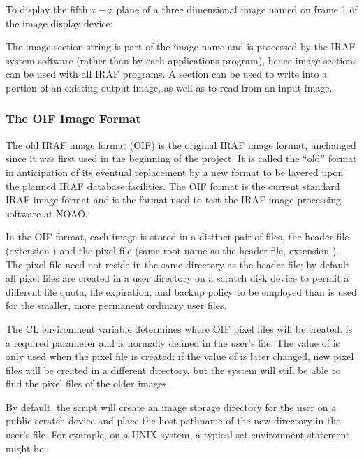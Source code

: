 \noindent
To display the fifth $x-z$ plane of a three dimensional image named 
 on frame 1 of the image display device:

\begin{quotation}\noindent
{} 
\end{quotation}

\noindent
The image section string is part of the image name and is processed by
the IRAF system software (rather than by each applications program),
hence image sections can be used with all IRAF programs.  A section can
be used to write into a portion of an existing output image, as well as to
read from an input image.

\subsubsection{The OIF Image Format}

\ppind
The old IRAF image format (OIF) is the original IRAF image format,
unchanged since it was first used in the beginning of the project. 
It is called the ``old'' format in anticipation of its eventual replacement
by a new format to be layered upon the planned IRAF database facilities.
The OIF format is the current standard IRAF image format and is the format
used to test the IRAF image processing software at NOAO.

In the OIF format, each image is stored in a distinct pair of files, the
header file (extension ) and the pixel file (same root name as
the header file, extension ).  The pixel file need not reside in
the same directory as the header file; by default all pixel files are
created in a user directory on a scratch disk device to permit a different
file quota, file expiration, and backup policy to be employed than is used
for the smaller, more permanent ordinary user files.

The CL environment variable  determines where OIF pixel files
will be created.   is a required parameter and is normally
defined in the user's  file.  The value of 
is only used when the pixel file is created; if the value of 
is later changed, new pixel files will be created in a different directory,
but the system will still be able to find the pixel files of the older images.

By default, the  script will create an image storage
directory for the user on a public scratch device and place the host pathname
of the new directory in the user's  file.  For example,
on a UNIX system, a typical set environment statement might be:


